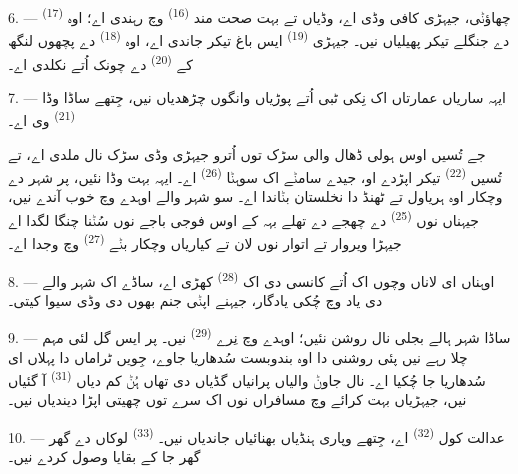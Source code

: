 \VUsaut{5.0mm}
\VUsaut{3.4mm}

6. --- چھاؤݨی، جیہڑی کافی وڈی اے، وڈیاں تے بہت صحت مند 
\textsuperscript{(16)} وچ رہندی اے؛ اوہ  \textsuperscript{(17)} دے
جنگلے تیکر پھیلیاں نیں۔ جیہڑی  \textsuperscript{(19)} ایس باغ تیکر
جاندی اے، اوہ  \textsuperscript{(18)} دے پچھوں لنگھ کے
 \textsuperscript{(20)} دے چونک اُتے نکلدی اے۔

7. --- ایہہ ساریاں عمارتاں اک نِکی ٹبی اُتے پوڑیاں وانگوں چڑھدیاں نیں، جِتھے ساڈا
وڈا  \textsuperscript{(21)} وی اے۔

جے تُسیں اوس ہولی ڈھال والی سڑک توں اُترو جیہڑی وڈی سڑک نال ملدی اے، تے تُسیں
 \textsuperscript{(22)} تیکر اپڑدے او، جیدے سامݨے اک سوہݨا
 \textsuperscript{(26)} اے۔ ایہہ  بہت وڈا نئیں، پر شہر
دے وچکار اوہ ہریاول تے ٹھنڈ دا نخلستان بݨاندا اے۔ سو شہر والے اوہدے وچ خوب آندے
نیں، جیہناں نوں  \textsuperscript{(25)} دے چھجے دے تھلے بہہ کے اوس
فوجی باجے نوں سُݨنا چنگا لگدا اے جیہڑا ویروار تے اتوار نوں لان تے کیاریاں وچکار
بݨے  \textsuperscript{(27)} وچ وجدا اے۔

8. --- اوہناں ای لاناں وچوں اک اُتے کانسی دی اک  \textsuperscript{(28)}
کھڑی اے، ساڈے اک شہر والے دی یاد وچ چُکی یادگار، جیہنے اپݨی جنم بھوں دی وڈی سیوا
کیتی۔

\VUsaut{4.0mm}
\VUsaut{3.4mm}

9. --- ساڈا شہر ہالے بجلی نال روشن نئیں؛ اوہدے وچ نِرے 
\textsuperscript{(29)} نیں۔ پر  ایس گل لئی مہم چلا رہے نیں پئی
روشنی دا اوہ بندوبست سُدھاریا جاوے، جِویں ٹراماں دا 
پہلاں ای سُدھاریا جا چُکیا اے۔  نال  جاوݨ والیاں
پرانیاں گڈیاں دی تھاں ہُݨ کم دیاں  \textsuperscript{(31)}
آ گئیاں نیں، جیہڑیاں بہت  کرائے وچ مسافراں نوں  اک سرے
توں  چھیتی اپڑا دیندیاں نیں۔

10. --- عدالت کول  \textsuperscript{(32)} اے، جِتھے وپاری ہنڈیاں بھنائیاں
جاندیاں نیں۔  \textsuperscript{(33)} لوکاں دے گھر گھر جا کے
بقایا وصول کردے نیں۔

\VUsaut{4.0mm}
\VUsaut{3.4mm}


